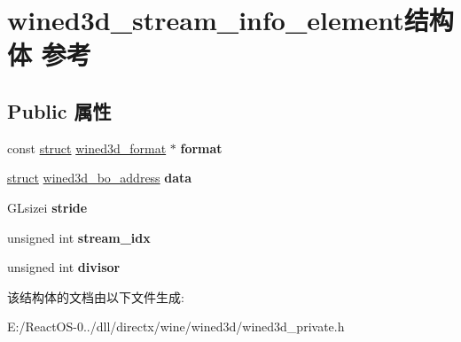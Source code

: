 \hypertarget{structwined3d__stream__info__element}{}\section{wined3d\+\_\+stream\+\_\+info\+\_\+element结构体 参考}
\label{structwined3d__stream__info__element}
\subsection*{Public 属性}
\begin{DoxyCompactItemize}
\item 
\mbox{\label{structwined3d__stream__info__element_a02e1d2c4d6b3cdbd4c5187fb2c48720c}} 
const \hyperlink{interfacestruct}{struct} \hyperlink{structwined3d__format}{wined3d\+\_\+format} $\ast$ {\bfseries format}
\item 
\mbox{\label{structwined3d__stream__info__element_a4ddefe2fe601c9120c5a2ab2b5ab0be6}} 
\hyperlink{interfacestruct}{struct} \hyperlink{structwined3d__bo__address}{wined3d\+\_\+bo\+\_\+address} {\bfseries data}
\item 
\mbox{\label{structwined3d__stream__info__element_abc65ab3b524eabbc51a0368c3efbef9d}} 
G\+Lsizei {\bfseries stride}
\item 
\mbox{\label{structwined3d__stream__info__element_ac917f0b243607907f02edba3dbc87244}} 
unsigned int {\bfseries stream\+\_\+idx}
\item 
\mbox{\label{structwined3d__stream__info__element_adf2ff0fbc92f66d130a0f09cbcfcdff4}} 
unsigned int {\bfseries divisor}
\end{DoxyCompactItemize}


该结构体的文档由以下文件生成\+:\begin{DoxyCompactItemize}
\item 
E\+:/\+React\+O\+S-\/0../dll/directx/wine/wined3d/wined3d\+\_\+private.\+h\end{DoxyCompactItemize}
